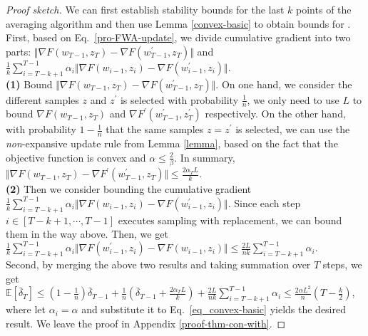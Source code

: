 \begin{proof}[Proof sketch]
We can first establish stability bounds for the last $k$ points of the averaging algorithm and then use Lemma \ref{convex-basic} to obtain bounds for \method{}. \\
First, based on Eq.~\eqref{pro-FWA-update}, we divide cumulative gradient into two parts: $\Vert \nabla F(w_{T-1},z_{T}) - \nabla F(w^{\prime}_{T-1},z_{T}) \Vert$ and $\frac{1}{k}\sum_{i=T-k+1}^{T-1} \alpha_i \Vert \nabla F(w_{i-1},z_{i}) - \nabla F(w^{\prime}_{i-1},z_{i}) \Vert$. \\
{\bf(1)} Bound $\Vert \nabla F(w_{T-1},z_{T}) - \nabla F(w^{\prime}_{T-1},z_{T}) \Vert$. On one hand, we consider the different samples $z$ and $z^{\prime}$ is selected with probability $\frac{1}{n}$, we only need to use $L$ to bound $\nabla F(w_{T-1},z_{T})$ and $\nabla F^{\prime}(w^{\prime}_{T-1},z_{T}^{\prime})$ respectively. On the other hand, with probability $1-\frac{1}{n}$ that the same samples $z=z^{\prime}$ is selected, we can use the \emph{non}-expansive update rule from Lemma \ref{lemma}, based on the fact that the objective function is convex and $\alpha\leq\frac{2}{\beta}$. In summary, $\Vert \nabla F(w_{T-1},z_{T}) - \nabla F^{\prime}(w_{T-1}^{\prime},z_{T}) \Vert \leq \frac{2\alpha_T L}{k}$. \\
{\bf(2)} Then we consider bounding the cumulative gradient $\frac{1}{k}\sum_{i=T-k+1}^{T-1} \alpha_i \Vert \nabla F(w_{i-1},z_{i}) - \nabla F(w^{\prime}_{i-1},z_{i}) \Vert$. Since each step $i\in [T-k+1,\cdots, T-1]$ executes sampling with replacement, we can bound them in the way above. Then, we get $\frac{1}{k}\sum_{i=T-k+1}^{T-1}\alpha_i \Vert\nabla F(w^{\prime}_{i-1},z_i) - \nabla F(w_{i-1},z_i) \Vert \leq \frac{2L}{nk}\sum_{i=T-k+1}^{T-1}\alpha_i.$ \\
Second, by merging the above two results and taking summation over $T$ steps, we get $\mathbb{E}\left[\bar{\delta}_{T}\right] \leq (1 \!-\!\frac{1}{n})\bar{\delta}_{T-1}\! +\! \frac{1}{n}\left(\bar{\delta}_{T-1}+\frac{2\alpha_T L}{k}\right)\! +\! \frac{2L}{nk}\sum_{i=T-k+1}^{T-1}\alpha_i \! \leq \! \frac{2\alpha L^2}{n} \left( T - \frac{k}{2} \right)$,
where let $\alpha_i=\alpha$ and substitute it to Eq.~\eqref{eq_convex-basic} yields the desired result.
We leave the proof in Appendix \ref{proof-thm-con-with}.
\end{proof}

